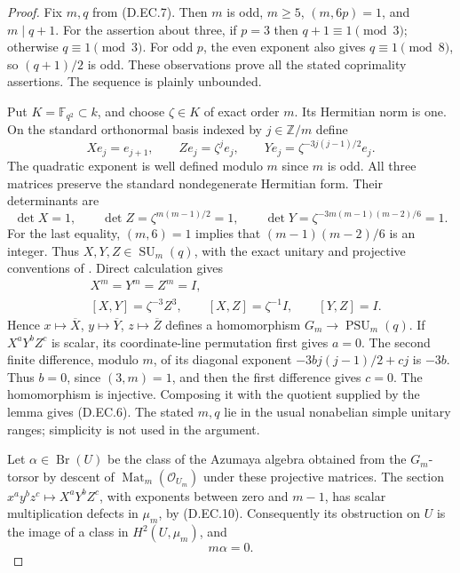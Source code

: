 \begin{proof}
Fix $m,q$ from (D.EC.7). Then $m$ is odd, $m\ge5$,
$(m,6p)=1$, and $m\mid q+1$. For the assertion about three,
if $p=3$ then $q+1\equiv1\pmod3$; otherwise $q\equiv1\pmod3$.
For odd $p$, the even exponent also gives $q\equiv1\pmod8$,
so $(q+1)/2$ is odd. These observations prove all the stated
coprimality assertions. The sequence is plainly unbounded.

Put $K=\mathbb F_{q^2}\subset k$, and choose $\zeta\in K$
of exact order $m$. Its Hermitian norm is one.
On the standard orthonormal basis indexed by $j\in\mathbb Z/m$
define
\[
 Xe_j=e_{j+1},\qquad Ze_j=\zeta^j e_j,\qquad
 Ye_j=\zeta^{-3j(j-1)/2}e_j.                            \tag{D.EC.8}
\]
The quadratic exponent is well defined modulo $m$ since
$m$ is odd. All three matrices preserve the standard
nondegenerate Hermitian form. Their determinants are
\[
 \det X=1,\qquad \det Z=\zeta^{m(m-1)/2}=1,
 \qquad \det Y=\zeta^{-3m(m-1)(m-2)/6}=1.               \tag{D.EC.9}
\]
For the last equality, $(m,6)=1$ implies that
$(m-1)(m-2)/6$ is an integer.
Thus $X,Y,Z\in\operatorname{SU}_m(q)$, with the exact
unitary and projective conventions of
\citet[pp.~114--116, Lemma~10.1]{Taylor1992ClassicalB}.
Direct calculation gives
\[
 \begin{aligned}
 &X^m=Y^m=Z^m=I,\\
 &[X,Y]=\zeta^{-3}Z^3,\qquad [X,Z]=\zeta^{-1}I,
          \qquad [Y,Z]=I .
 \end{aligned}                                                \tag{D.EC.10}
\]
Hence $x\mapsto\overline X$, $y\mapsto\overline Y$,
$z\mapsto\overline Z$ defines a homomorphism
$G_m\to\operatorname{PSU}_m(q)$.
If $X^aY^bZ^c$ is scalar, its coordinate-line permutation
first gives $a=0$. The second finite difference, modulo $m$,
of its diagonal exponent $-3b j(j-1)/2+cj$ is $-3b$.
Thus $b=0$, since $(3,m)=1$, and then the first difference
gives $c=0$. The homomorphism is injective.
Composing it with the quotient supplied by the lemma gives
(D.EC.6). The stated $m,q$ lie in the usual nonabelian simple
unitary ranges; simplicity is not used in the argument.

Let $\alpha\in\operatorname{Br}(U)$ be the class of the
Azumaya algebra obtained from the $G_m$-torsor by descent
of $\operatorname{Mat}_m(\mathcal O_{U_m})$ under these
projective matrices. The section
$x^ay^bz^c\mapsto X^aY^bZ^c$, with exponents between zero
and $m-1$, has scalar multiplication defects in $\mu_m$,
by (D.EC.10). Consequently its obstruction on $U$ is the
image of a class in $H^2(U,\mu_m)$, and
\[
                              m\alpha=0.               \tag{D.EC.11}
\]


\end{proof}
